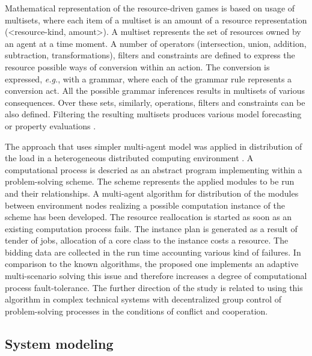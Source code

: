 \documentclass[conference,a4paper]{IEEEtran}
\begin{document}
Mathematical representation of the resource-driven games is based on usage of multisets, where each item of a multiset is an amount of a resource representation (<resource-kind, amount>). A multiset represents the set of resources owned by an agent at a time moment. A number of operators (intersection, union, addition, subtraction, transformations), filters and constraints are defined to express the resource possible ways of conversion within an action. The conversion is expressed, \emph{e.g.}, with a grammar, where each of the grammar rule represents a conversion act. All the possible grammar inferences results in multisets of various consequences. Over these sets, similarly, operations, filters and constraints can be also defined. Filtering the resulting multisets produces various model forecasting or property evaluations \cite{rbg}.

The approach that uses simpler multi-agent model was applied in distribution of the load in a heterogeneous distributed computing environment \cite{b1}. A computational process is descried as an abstract program implementing within a problem-solving scheme. The scheme represents the applied modules to be run and their relationships. A multi-agent algorithm for distribution of the modules between environment nodes realizing a possible computation instance of the scheme has been developed. The resource reallocation is started as soon as an existing computation process fails. The instance plan is generated as a result of tender of jobs, allocation of a core class to the instance costs a resource. The bidding data are collected in the run time accounting various kind of failures. In comparison to the known algorithms, the proposed one implements an adaptive multi-scenario solving this issue and therefore increases a degree of computational process fault-tolerance. The further direction of the study is related to using this algorithm in complex technical systems with decentralized group control of problem-solving processes in the conditions of conflict and cooperation.


\subsection{System modeling}
\label{sec:sys-mdl}
\end{document}
